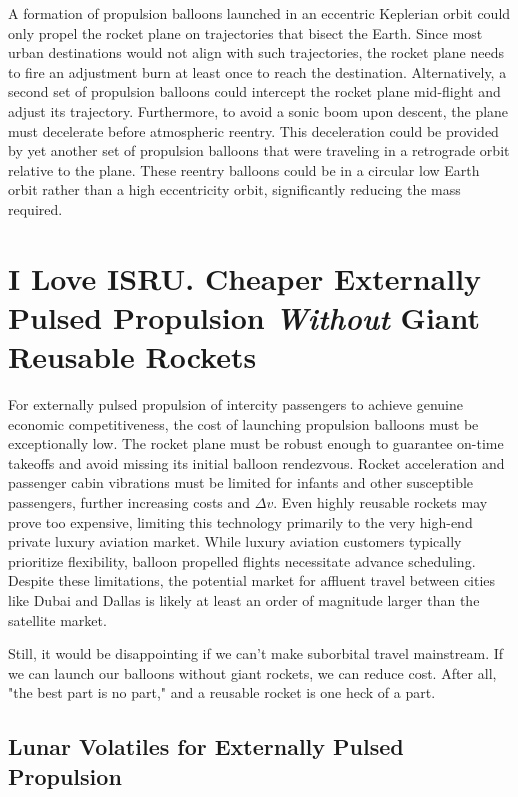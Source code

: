 \documentclass{article}
\begin{document}
{A formation of propulsion balloons launched in an eccentric Keplerian orbit could only propel the  rocket plane on trajectories that bisect the Earth. Since most urban destinations would not align with such trajectories, the rocket plane needs to fire an adjustment burn at least once to reach the destination. Alternatively, a second set of propulsion balloons could intercept the rocket plane mid-flight and adjust its trajectory. Furthermore, to avoid a sonic boom upon descent, the plane must decelerate before atmospheric reentry. This deceleration could be provided by yet another set of propulsion balloons that were traveling in a retrograde orbit relative to the plane. These reentry balloons could be in a circular low Earth orbit rather than a high eccentricity orbit, significantly reducing the mass required.

\section{I Love ISRU.  Cheaper Externally Pulsed Propulsion \textit{Without} Giant Reusable Rockets}
For externally pulsed propulsion of intercity passengers to achieve genuine economic competitiveness, the cost of launching  propulsion balloons must be exceptionally low.  The rocket plane must be robust enough to guarantee on-time takeoffs and avoid missing its initial balloon rendezvous.  Rocket acceleration and passenger cabin vibrations must be limited for infants and other susceptible passengers, further increasing costs and $\Delta v$.  Even highly reusable rockets may prove too expensive, limiting this technology primarily to the very high-end private luxury aviation market. While luxury aviation customers typically prioritize flexibility, balloon propelled flights necessitate advance scheduling.  Despite these limitations, the potential market for affluent travel between cities like Dubai and Dallas is likely at least an order of magnitude larger than the satellite market.

Still, it would be disappointing if we can't make suborbital travel mainstream.   If we can launch our balloons without giant rockets, we can reduce cost.   After all, "the best part is no part," \cite{best_part_no_part} and a reusable rocket is one heck of a part.

\subsection{Lunar Volatiles for Externally Pulsed Propulsion}

}
\end{document}
